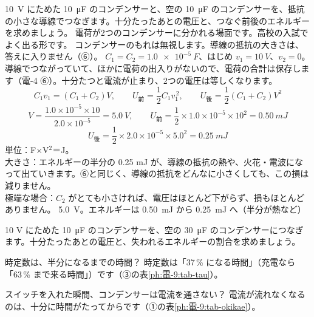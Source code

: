 \label{ph:電-9:ex12}
\begin{phreidai}[2つのコンデンサーをつなぐ]
\qty{10}{V} にためた \qty{10}{\micro F} のコンデンサーと、空の \qty{10}{\micro F} のコンデンサーを、抵抗の小さな導線でつなぎます。十分たったあとの電圧と、つなぐ前後のエネルギーを求めましょう。
\phbamen
電荷が2つのコンデンサーに分かれる場面です。高校の入試でよく出る形です。
\phmushi
コンデンサーのもれは無視します。導線の抵抗の大きさは、答えに入りません（⑥）。
\phzu
$C_1=C_2=\qty{1.0e-5}{F}$、はじめ $v_1=\qty{10}{V}$、$v_2=0$。
\phriyu
導線でつながっていて、ほかに電荷の出入りがないので、電荷の合計は保存します（電-4 ⑥）。十分たつと電流が止まり、2つの電圧は等しくなります。
\phtateru
\[ C_1v_1=(C_1+C_2)V,\qquad U_{\text{前}}=\frac12C_1v_1^{\,2},\qquad U_{\text{後}}=\frac12(C_1+C_2)V^2 \]
\phtoku
\[ V=\frac{1.0\times10^{-5}\times10}{2.0\times10^{-5}}=\qty{5.0}{V},\qquad U_{\text{前}}=\frac12\times1.0\times10^{-5}\times10^2=\qty{0.50}{mJ} \]
\[ U_{\text{後}}=\frac12\times2.0\times10^{-5}\times5.0^2=\qty{0.25}{mJ} \]
\phtashikame
単位：F×V$^2$＝J。\\
大きさ：エネルギーの半分の 0.25 mJ が、導線の抵抗の熱や、火花・電波になって出ていきます。⑥と同じく、導線の抵抗をどんなに小さくしても、この損は減りません。\\
極端な場合：$C_2$ がとても小さければ、電圧はほとんど下がらず、損もほとんどありません。
\kotae \qty{5.0}{V}。エネルギーは \qty{0.50}{mJ} から \qty{0.25}{mJ} へ（半分が熱など）
\end{phreidai}
\begin{jibun}
10 V にためた \qty{10}{\micro F} のコンデンサーを、空の \qty{30}{\micro F} のコンデンサーにつなぎます。十分たったあとの電圧と、失われるエネルギーの割合を求めましょう。
\end{jibun}

\begin{tsumazuki}{時定数は、半分になるまでの時間？}
時定数は「37\,\% になる時間」（充電なら「63\,\% まで来る時間」）です（③の表\ref{ph:電-9:tab-tau}）。
\end{tsumazuki}

\begin{tsumazuki}{スイッチを入れた瞬間、コンデンサーは電流を通さない？}
電流が流れなくなるのは、十分に時間がたってからです（①の表\ref{ph:電-9:tab-okikae}）。
\end{tsumazuki}

